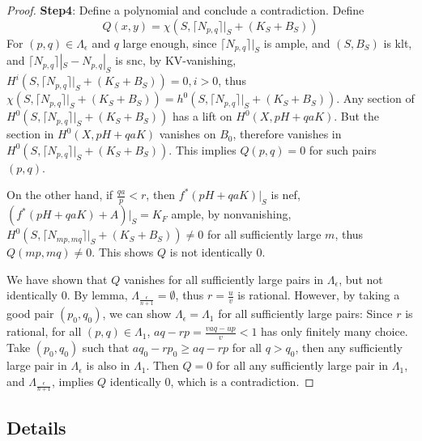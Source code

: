 \documentclass{article}
\begin{document}
\begin{proof}
\textbf{Step4}: Define a polynomial and conclude a contradiction. Define
\[ Q(x,y)=\chi(S,\lceil N_{p,q}\rceil|_S+(K_S+B_S)) \]
For $ (p,q)\in \Lambda_{\epsilon} $ and $ q $ large enough,  since $ \lceil N_{p,q}\rceil|_S  $ is ample, and $ (S,B_S) $ is klt, and $ \lceil N_{p,q}\rceil|_S-N_{p,q}|_S $ is snc, by KV-vanishing, $ H^i(S,\lceil N_{p,q}\rceil|_S+(K_S+B_S))=0, i>0 $, thus $\chi(S,\lceil N_{p,q}\rceil|_S+(K_S+B_S))=h^0(S,\lceil N_{p,q}\rceil|_S+(K_S+B_S))  $. Any section of $ H^0(S,\lceil N_{p,q}\rceil|_S+(K_S+B_S)) $ has a lift on $ H^0(X,pH+qaK) $. But the section in $ H^0(X,pH+qaK) $ vanishes on $ B_0 $, therefore vanishes in $ H^0(S,\lceil N_{p,q}\rceil|_S+(K_S+B_S)) $. This implies $ Q(p,q)=0 $ for such pairs $ (p,q) $.

On the other hand, if $ \frac{qa}{p}<r $, then $ f^*(pH+qaK)|_S $ is nef, $ (f^*(pH+qaK)+A)|_S=K_F $ ample, by nonvanishing, $ H^0(S,\lceil N_{mp,mq}\rceil|_S+(K_S+B_S))\neq 0 $ for all sufficiently large $ m $, thus $ Q(mp,mq)\neq 0 $. This  shows $ Q $ is not identically $ 0 $.

We have shown that $ Q $ vanishes for all sufficiently large pairs in $ \Lambda_{\epsilon} $, but not identically $ 0 $. By lemma, $ \Lambda_{\frac{\epsilon}{n+1}}= \emptyset $, thus $ r=\frac{u}{v} $ is rational. However, by taking a good pair $ (p_0,q_0) $, we can show $ \Lambda_{\epsilon}=\Lambda_1 $ for all sufficiently large pairs: Since $ r $ is rational, for all $ (p,q) \in \Lambda_1$, $ aq-rp=\frac{vaq-up}{v}<1 $ has only finitely many choice. Take $ (p_0,q_0) $ such that $ aq_0-rp_0\geqslant aq-rp $ for all $ q>q_0 $, then any sufficiently large pair in $ \Lambda_{\epsilon} $ is also in $ \Lambda_1 $. Then $ Q=0 $ for all any sufficiently large pair  in $ \Lambda_1 $, and $ \Lambda_{\frac{\epsilon}{n+1}} $, implies $ Q $ identically $ 0 $, which is a contradiction.


\end{proof}
\subsection{Details}
\end{document}
